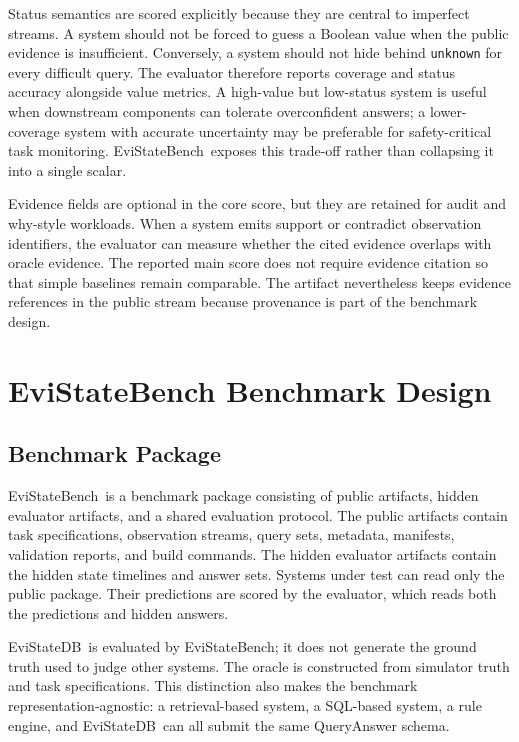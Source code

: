 \documentclass[conference]{IEEEtran}
\newcommand{\bench}{EviStateBench}
\newcommand{\engine}{EviStateDB}
\begin{document}
Status semantics are scored explicitly because they are central to imperfect streams. A system should not be forced to guess a Boolean value when the public evidence is insufficient. Conversely, a system should not hide behind \texttt{unknown} for every difficult query. The evaluator therefore reports coverage and status accuracy alongside value metrics. A high-value but low-status system is useful when downstream components can tolerate overconfident answers; a lower-coverage system with accurate uncertainty may be preferable for safety-critical task monitoring. \bench\ exposes this trade-off rather than collapsing it into a single scalar.

Evidence fields are optional in the core score, but they are retained for audit and why-style workloads. When a system emits support or contradict observation identifiers, the evaluator can measure whether the cited evidence overlaps with oracle evidence. The reported main score does not require evidence citation so that simple baselines remain comparable. The artifact nevertheless keeps evidence references in the public stream because provenance is part of the benchmark design.

\section{EviStateBench Benchmark Design}
\label{sec:benchmark}

\subsection{Benchmark Package}

\bench\ is a benchmark package consisting of public artifacts, hidden evaluator artifacts, and a shared evaluation protocol. The public artifacts contain task specifications, observation streams, query sets, metadata, manifests, validation reports, and build commands. The hidden evaluator artifacts contain the hidden state timelines and answer sets. Systems under test can read only the public package. Their predictions are scored by the evaluator, which reads both the predictions and hidden answers.

\engine\ is evaluated by \bench; it does not generate the ground truth used to judge other systems. The oracle is constructed from simulator truth and task specifications. This distinction also makes the benchmark representation-agnostic: a retrieval-based system, a SQL-based system, a rule engine, and \engine\ can all submit the same QueryAnswer schema.
\end{document}
